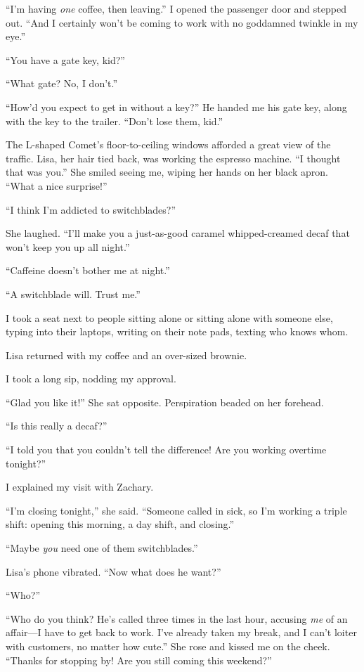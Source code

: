 ``I'm having \emph{one} coffee, then leaving.'' I opened the passenger
door and stepped out. ``And I certainly won't be coming to work with no
goddamned twinkle in my eye.''

``You have a gate key, kid?''

``What gate? No, I don't.''

``How'd you expect to get in without a key?'' He handed me his gate key,
along with the key to the trailer. ``Don't lose them, kid.''

The L-shaped Comet's floor-to-ceiling windows afforded a great view of
the traffic. Lisa, her hair tied back, was working the espresso machine.
``I thought that was you.'' She smiled seeing me, wiping her hands on
her black apron. ``What a nice surprise!''

``I think I'm addicted to switchblades?''

She laughed. ``I'll make you a just-as-good caramel whipped\--\-creamed
decaf that won't keep you up all night.''

``Caffeine doesn't bother me at night.''

``A switchblade will. Trust me.''

I took a seat next to people sitting alone or sitting alone with someone
else, typing into their laptops, writing on their note pads, texting who
knows whom.

Lisa returned with my coffee and an over-sized brownie.

I took a long sip, nodding my approval.

``Glad you like it!'' She sat opposite. Perspiration beaded on her
forehead.

``Is this really a decaf?''

``I told you that you couldn't tell the difference! Are you working
overtime tonight?''

I explained my visit with Zachary.

``I'm closing tonight,'' she said. ``Someone called in sick, so I'm
working a triple shift: opening this morning, a day shift, and
closing.''

``Maybe \emph{you} need one of them switchblades.''

Lisa's phone vibrated. ``Now what does he want?''

``Who?''

``Who do you think? He's called three times in the last hour, accusing
\emph{me} of an affair---I have to get back to work. I've already taken
my break, and I can't loiter with customers, no matter how cute.'' She
rose and kissed me on the cheek. ``Thanks for stopping by! Are you still
coming this weekend?''

